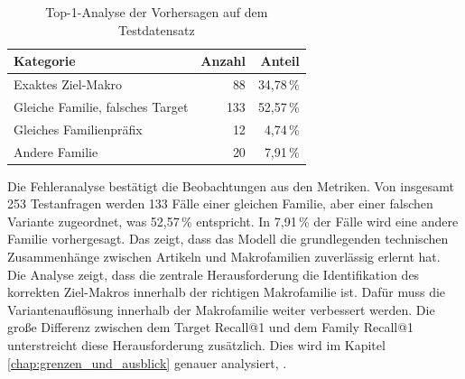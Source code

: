 \begin{table}[H] 
  \centering 
  \caption{Top-1-Analyse der Vorhersagen auf dem Testdatensatz} 
  \label{tab:fehleranalyse_top1} 
  \begin{tabular}{lrr} 
    \toprule 
    \textbf{Kategorie} & \textbf{Anzahl} & \textbf{Anteil} \\ 
    \midrule 
    Exaktes Ziel-Makro \parencite{EPLAN-Makros} & 88 & 34,78\,\% \\
    Gleiche Familie, falsches Target & 133 & 52,57\,\% \\
    Gleiches Familienpräfix & 12 & 4,74\,\% \\
    Andere Familie & 20 & 7,91\,\% \\
    \bottomrule 
  \end{tabular} 
\end{table}

Die Fehleranalyse bestätigt die Beobachtungen aus den Metriken. Von insgesamt 253 Testanfragen werden 133 Fälle einer gleichen Familie, aber einer falschen Variante zugeordnet, was 52,57\,\% entspricht.
In 7,91\,\% der Fälle wird eine andere Familie vorhergesagt. Das zeigt, dass das Modell die grundlegenden technischen Zusammenhänge zwischen Artikeln und Makrofamilien zuverlässig erlernt hat.
Die Analyse zeigt, dass die zentrale Herausforderung die Identifikation des korrekten Ziel-Makros \parencite{EPLAN-Makros} innerhalb der richtigen Makrofamilie ist. Dafür muss die Variantenauflösung innerhalb der Makrofamilie weiter verbessert werden.
Die große Differenz zwischen dem Target Recall@1 und dem Family Recall@1 unterstreicht diese Herausforderung zusätzlich.
Dies wird im Kapitel \ref{chap:grenzen_und_ausblick} genauer analysiert, \parencite{LTR_Configuration_Test_Series}.






